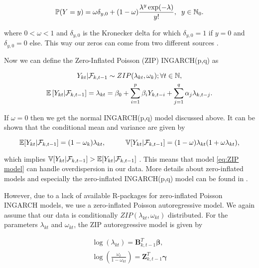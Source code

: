 \begin{equation}
\mathbb{P}(Y=y) = \omega \delta_{y,0}+ (1-\omega) \frac{\lambda^y \exp(-\lambda)}{y!}, \hspace{0.2cm} y \in \mathbb{N}_0.
\label{eq:ZIP Distribution}
\end{equation}

where $0 < \omega < 1$ and $\delta_{y,0}$ is the Kronecker delta for which $\delta_{y,0}=1$ if $y=0$ and $\delta_{y,0}=0$ else. This way our zeros can come from two different sources \cite{Zhu:2012}. 

Now we can define the Zero-Inflated Poisson (ZIP) INGARCH(p,q) as

\begin{gather}
\label{eq:ZIP model}
Y_{kt} | \mathcal{F}_{k,t-1} \sim ZIP(\lambda_{kt},\omega_k); \forall t \in \mathbb{N}, \\
\mathbb{E}\left[Y_{kt} | \mathcal{F}_{k,t-1} \right] = \lambda_{kt} = \beta_0 + \sum_{i=1}^p\beta_i Y_{k,t-i} + \sum_{j=1}^q\alpha_j \lambda_{k,t-j}.
\end{gather}

If $\omega =0$ then we get the normal INGARCH(p,q) model discussed above. It can be shown that the conditional mean and variance are given by

\begin{equation}
\mathbb{E}[Y_{kt} | \mathcal{F}_{k,t-1}] = (1-\omega_k)\lambda_{kt}, \hspace{1cm} \mathbb{V}[Y_{kt} | \mathcal{F}_{k,t-1}] =(1-\omega)\lambda_{kt}(1+\omega \lambda_{kt}),
\label{eq:Conditional Mean and Variance ZIP}
\end{equation}

which implies $ \mathbb{V}[Y_{kt} | \mathcal{F}_{k,t-1}] > \mathbb{E}[Y_{kt} | \mathcal{F}_{k,t-1}]$ \cite{Zhu:2012}. This means that model \ref{eq:ZIP model} can handle overdispersion in our data. More details about zero-inflated models and especially the zero-inflated INGARCH(p,q) model can be found in \cite{Zhu:2012}.

However, due to a lack of available R-packages for zero-inflated Poisson INGARCH models, we use a zero-inflated Poisson autoregressive model. We again assume that our data is conditionally $ZIP(\lambda_{kt},\omega_{kt})$ distributed. For the parameters $\lambda_{kt}$ and $\omega_{kt}$, the ZIP autoregressive model is given by \cite{Yang:2013}

\begin{gather}
\log(\lambda_{kt}) = \bm{B}^T_{k,t-1} \bm{\beta},\\
\log\left(\frac{\omega_{t}}{1-\omega_{kt}}\right)=\bm{Z}_{k,t-1}^T\bm{\gamma}
\label{eq:ZIP Autoregressive model}
\end{gather}

